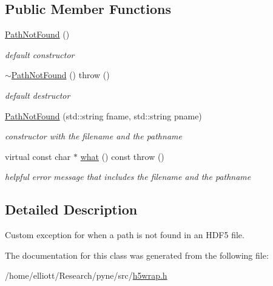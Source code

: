 \subsection*{Public Member Functions}
\begin{DoxyCompactItemize}
\item 
\hypertarget{classh5wrap_1_1_path_not_found_a7b05229fb4f02920732f22622af1f08e}{\hyperlink{classh5wrap_1_1_path_not_found_a7b05229fb4f02920732f22622af1f08e}{Path\-Not\-Found} ()}\label{classh5wrap_1_1_path_not_found_a7b05229fb4f02920732f22622af1f08e}

\begin{DoxyCompactList}\small\item\em default constructor \end{DoxyCompactList}\item 
\hypertarget{classh5wrap_1_1_path_not_found_acf9696ccdfb4a4c63454dbfc1dcde060}{\hyperlink{classh5wrap_1_1_path_not_found_acf9696ccdfb4a4c63454dbfc1dcde060}{$\sim$\-Path\-Not\-Found} ()  throw ()}\label{classh5wrap_1_1_path_not_found_acf9696ccdfb4a4c63454dbfc1dcde060}

\begin{DoxyCompactList}\small\item\em default destructor \end{DoxyCompactList}\item 
\hypertarget{classh5wrap_1_1_path_not_found_aaedd26703acced17206eb8dabd4c5274}{\hyperlink{classh5wrap_1_1_path_not_found_aaedd26703acced17206eb8dabd4c5274}{Path\-Not\-Found} (std\-::string fname, std\-::string pname)}\label{classh5wrap_1_1_path_not_found_aaedd26703acced17206eb8dabd4c5274}

\begin{DoxyCompactList}\small\item\em constructor with the filename and the pathname \end{DoxyCompactList}\item 
\hypertarget{classh5wrap_1_1_path_not_found_ad454d14e0f9f44f4357a5c33a7017b88}{virtual const char $\ast$ \hyperlink{classh5wrap_1_1_path_not_found_ad454d14e0f9f44f4357a5c33a7017b88}{what} () const   throw ()}\label{classh5wrap_1_1_path_not_found_ad454d14e0f9f44f4357a5c33a7017b88}

\begin{DoxyCompactList}\small\item\em helpful error message that includes the filename and the pathname \end{DoxyCompactList}\end{DoxyCompactItemize}


\subsection{Detailed Description}
Custom exception for when a path is not found in an H\-D\-F5 file. 

The documentation for this class was generated from the following file\-:\begin{DoxyCompactItemize}
\item 
/home/elliott/\-Research/pyne/src/\hyperlink{h5wrap_8h}{h5wrap.\-h}\end{DoxyCompactItemize}
